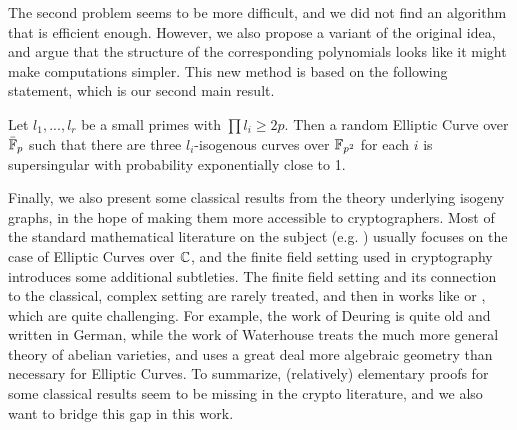 The second problem seems to be more difficult, and we did not find an algorithm that is efficient enough.
However, we also propose a variant of the original idea, and argue that the structure of the corresponding polynomials looks like it might make computations simpler.
This new method is based on the following statement, which is our second main result.
\begin{prop}
    \label{prop:main_result2}
    Let $l_1, ..., l_r$ be a small primes with $\prod l_i \geq 2p$.
    Then a random Elliptic Curve over $\bar{\mathbb{F}}_p$ such that there are three $l_i$-isogenous curves over $\mathbb{F}_{p^2}$ for each $i$ is supersingular with probability exponentially close to 1.
\end{prop}
Finally, we also present some classical results from the theory underlying isogeny graphs, in the hope of making them more accessible to cryptographers.
Most of the standard mathematical literature on the subject (e.g. \cite{cox_primes_of_form}) usually focuses on the case of Elliptic Curves over $\mathbb{C}$, and the finite field setting used in cryptography introduces some additional subtleties.
The finite field setting and its connection to the classical, complex setting are rarely treated, and then in works like \cite{deuring_endomorphism_rings} or \cite{class_group_action_waterhouse}, which are quite challenging.
For example, the work of Deuring \cite{deuring_endomorphism_rings} is quite old and written in German, while the work of Waterhouse \cite{class_group_action_waterhouse} treats the much more general theory of abelian varieties, and uses a great deal more algebraic geometry than necessary for Elliptic Curves. 
To summarize, (relatively) elementary proofs for some classical results seem to be missing in the crypto literature, and we also want to bridge this gap in this work.